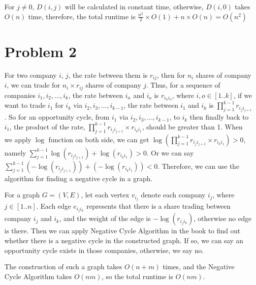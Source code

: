 \documentclass[letter,12pt]{article}
\begin{document}
 
For $j \neq 0$, $D(i, j)$ will be calculated in constant time, otherwise, 
$D(i,0)$ takes $O(n)$ time, therefore, the total runtime is $\frac{n^2}{2} 
\times O(1) + n \times O(n) = O(n^2)$

\section*{Problem 2}
For two company $i$, $j$, the rate between them is $r_{ij}$, then for $n_i$
shares of company $i$, we can trade for $n_i \times r_{ij}$ shares of 
company $j$. Thus, for a sequence of companies $i_1, i_2, ..., i_k$, the rate
between $i_n$ and $i_o$ is $r_{i_n i_o}$, where $i, o \in [1..k]$, if we want
to trade $i_1$ for $i_k$ via $i_2, i_3, ..., i_{k-1}$, the rate between $i_1$
and $i_k$ is $\prod\limits_{j=1}^{k-1} r_{i_j i_{j+1}}$. So for an opportunity
cycle, from $i_1$ via $i_2, i_3, ..., i_{k-1}$, to $i_k$ then finally back to 
$i_1$, the product of the rate, $\prod\limits_{j=1}^{k-1} r_{i_j i_{j+1}} 
\times r_{i_k i_1}$, should be greater than 1. When we apply $\log$ function
on both side, we can get $\log(\prod\limits_{j=1}^{k-1} r_{i_j i_{j+1}} 
\times r_{i_k i_1}) > 0$, namely $\sum\limits_{j=1}^{k-1} 
\log(r_{i_j i_{j+1}}) + \log(r_{i_k i_1}) > 0$. Or we can say 
$\sum\limits_{j=1}^{k-1} (-\log(r_{i_j i_{j+1}})) + (-\log(r_{i_k i_1})) < 0$.
Therefore, we can use the algorithm for finding a negative cycle in a graph.

For a graph $G=(V,E)$, let each vertex $v_{i_j}$ denote each company $i_j$,
where $j \in [1..n]$. Each edge $e_{i_j i_k}$ represents that there is a share 
trading between company $i_j$ and $i_k$, and the weight of the edge is 
$-\log(r_{i_j i_k})$, otherwise no edge is there. Then we can apply 
Negative Cycle Algorithm in the book to find out whether there is a negative
cycle in the constructed graph. If so, we can say an opportunity cycle exists
in those companies, otherwise, we say no.

The construction of such a graph takes $O(n+m)$ times, and the Negative
Cycle Algorithm takes $O(nm)$, so the total runtime is $O(nm)$.
\end{document}
